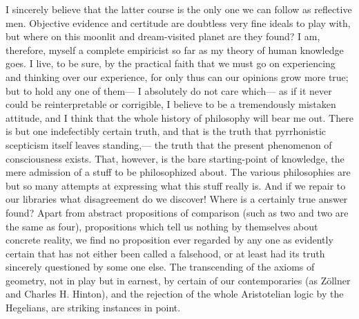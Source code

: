 \documentclass[12pt]{article}
\begin{document}
I sincerely believe that the latter course is the only one we can follow as reflective men.  Objective evidence and certitude are doubtless very fine ideals to play with, but where on this moonlit and dream-visited planet are they found?  I am, therefore, myself a complete empiricist so far as my theory of human knowledge goes.  I live, to be sure, by the practical faith that we must go on experiencing and thinking over our experience, for only thus can our opinions grow more true; but to hold any one of them--- I absolutely do not care which--- as if it never could be reinterpretable or corrigible, I believe to be a tremendously mistaken attitude, and I think that the whole history of philosophy will bear me out.  There is but one indefectibly certain truth, and that is the truth that pyrrhonistic scepticism itself leaves  standing,--- the truth that the present phenomenon of consciousness exists.  That, however, is the bare starting-point of knowledge, the mere admission of a stuff to be philosophized about.  The various philosophies are but so many attempts at expressing what this stuff really is.  And if we repair to our libraries what disagreement do we discover!  Where is a certainly true answer found?  Apart from abstract propositions of comparison (such as two and two are the same as four), propositions which tell us nothing by themselves about concrete reality, we find no proposition ever regarded by any one as evidently certain that has not either been called a falsehood, or at least had its truth sincerely questioned by some one else.  The transcending of the axioms of geometry, not in play but in earnest, by certain of our contemporaries (as Z\"{o}llner and Charles H. Hinton), and the rejection of the whole Aristotelian logic by the Hegelians, are striking instances in point.
\end{document}
